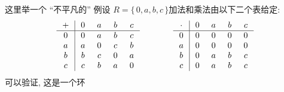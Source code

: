 \begin{example}
    这里举一个 ``不平凡的''  例\period 设 $R = \{\, 0,a,b,c \,\}$\period 加法和乘法由以下二个表给定:
    \begin{align*}
        \arraycolsep=0.25cm
        \begin{array}{c|cccc}
            + & 0 & a & b & c \\ \hline
            0 & 0 & a & b & c \\
            a & a & 0 & c & b \\
            b & b & c & 0 & a \\
            c & c & b & a & 0 \\
        \end{array}
        \qquad \qquad
        \begin{array}{c|cccc}
            \cdot & 0 & a & b & c \\ \hline
            0     & 0 & 0 & 0 & 0 \\
            a     & 0 & 0 & 0 & 0 \\
            b     & 0 & a & b & c \\
            c     & 0 & a & b & c \\
        \end{array}
    \end{align*}
    可以验证, 这是一个环\period
\end{example}

